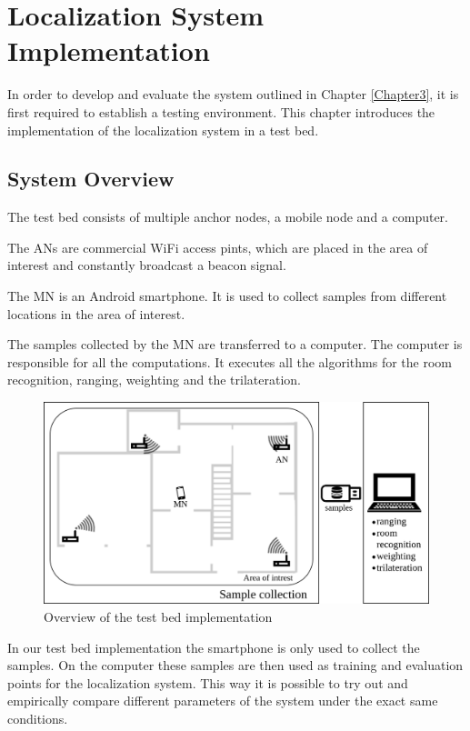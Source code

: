 \chapter{Localization System Implementation}

\label{Chapter4}

In order to develop and evaluate the system outlined in Chapter \ref{Chapter3}, it is first required to establish a testing environment.
This chapter introduces the implementation of the localization system in a test bed.

\section{System Overview}

The test bed consists of multiple anchor nodes, a mobile node and a computer.

The ANs are commercial WiFi access pints, which are placed in the area of interest and constantly broadcast a beacon signal.

The MN is an Android smartphone. It is used to collect samples from different locations in the area of interest.

The samples collected by the MN are transferred to a computer. The computer is responsible for all the computations. It executes all the algorithms for the room recognition, ranging, weighting and the trilateration.

\begin{figure}[ht]
\centering
\includegraphics[width=\textwidth]{Figures/SystemImplementationOverview}
\decoRule
\caption[Test bed implementation overview]{Overview of the test bed implementation}
\label{fig:localizationSystemOverview}
\end{figure}

In our test bed implementation the smartphone is only used to collect the samples. On the computer these samples are then used as training and evaluation points for the localization system. This way it is possible to try out and empirically compare different parameters of the system under the exact same conditions.

